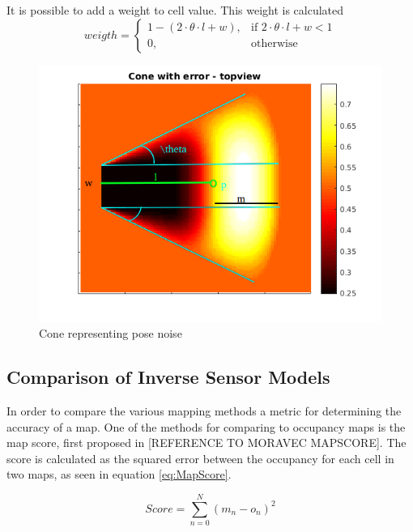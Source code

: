 It is possible to add a weight to cell value. This weight is calculated
\begin{equation}
\label{eq:cone-weight}
weigth = 
\begin{cases}
1 - ( 2 \cdot \theta \cdot l + w), & \text{if } 2 \cdot \theta \cdot l + w < 1\\
0, & \text{otherwise}
\end{cases}
\end{equation}

\begin{figure}
	\centering
	\includegraphics[width=\textwidth]{figures/static_mapping/cone_noise_top}
	\caption{Cone representing pose noise}
	\label{fig:cone_with_noise_top}
\end{figure}



\subsection{Comparison of Inverse Sensor Models}
In order to compare the various mapping methods a metric for determining the accuracy of a map. One of the methods for comparing to occupancy maps is the map score, first proposed in [REFERENCE TO MORAVEC MAPSCORE]. The score is calculated as the squared error between the occupancy for each cell in two maps, as seen in equation \ref{eq:MapScore}.

\begin{equation}
\label{eq:MapScore}
Score = \sum_{n=0}^{N} (m_{n} - o_{n})^2
\end{equation}

